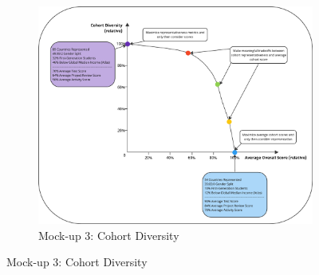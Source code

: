 \begin{figure}[htbp]
    \hfill
    \begin{subfigure}[b]{0.3\textwidth}
        \includegraphics[width=\textwidth]{figures/codesign/diversity.png}
        \caption{Mock-up 3: Cohort Diversity}
        \label{fig:diversity}
    \end{subfigure}

    \medskip


\end{figure}
